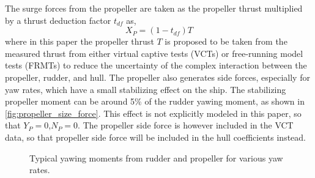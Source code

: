 \noindent The surge forces from the propeller are taken as the propeller thrust multiplied by a thrust deduction factor $t_{df}$ as,
\begin{equation}
    \label{eq:X_P}
    X_P = (1-t_{df})T
\end{equation}
where in this paper the propeller thrust $T$ is proposed to be taken from the measured thrust from either virtual captive tests (VCTs) or free-running model tests (FRMTs) to reduce the uncertainty of the complex interaction between the propeller, rudder, and hull. The propeller also generates side forces, especially for yaw rates, which have a small stabilizing effect on the ship. The stabilizing propeller moment can be around 5\% of the rudder yawing moment, as shown in \autoref{fig:propeller_size_force}.
This effect is not explicitly modeled in this paper, so that $Y_P=0$,$N_P=0$. The propeller side force is however included in the VCT data, so that propeller side force will be included in the hull coefficients instead.

\begin{figure}[h!]
    \centering   
    
    \caption{Typical yawing moments from rudder and propeller for various yaw rates.}
    \label{fig:propeller_size_force}
\end{figure}